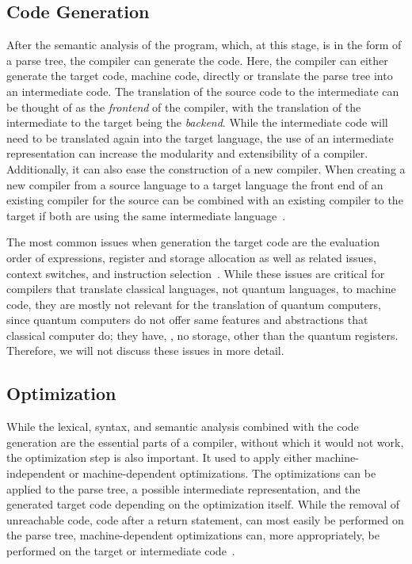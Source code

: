 \subsection{Code Generation}
\label{sec:background_codeGeneration}
After the semantic analysis of the program, which, at this stage, is in the form of a parse tree, the compiler can generate the code. Here, the compiler can either generate the target code, \eg machine code, directly or translate the parse tree into an intermediate code. 
The translation of the source code to the intermediate can be thought of as the \emph{frontend} of the compiler, with the translation of the intermediate to the target being the \emph{backend}. While the intermediate code will need to be translated again into the target language, the use of an intermediate representation can increase the modularity and extensibility of a compiler. Additionally, it can also ease the construction of a new compiler. When creating a new compiler from a source language to a target language the front end of an existing compiler for the source can be combined with an existing compiler to the target if both are using the same intermediate language~\cite{VSSD07, GFH82}.     

The most common issues when generation the target code are the evaluation order of expressions, register and storage allocation as well as related issues, context switches, and instruction selection~\cite{GFH82}. While these issues are critical for compilers that translate classical languages, \ie not quantum languages, to machine code, they are mostly not relevant for the translation of quantum computers, since quantum computers do not offer same features and abstractions that classical computer do; they have, \eg, no storage, other than the quantum registers.
Therefore, we will not discuss these issues in more detail.

\subsection{Optimization}
\label{sec:background_codeOptimization}
While the lexical, syntax, and semantic analysis combined with the code generation are the essential parts of a compiler, without which it would not work, the optimization step is also important. It used to apply either machine-independent or machine-dependent optimizations. The optimizations can be applied to the parse tree, a possible intermediate representation, and the generated target code depending on the optimization itself. While the removal of unreachable code, \eg code after a return statement, can most easily be performed on the parse tree, machine-dependent optimizations can, more appropriately, be performed on the target or intermediate code~\cite{Oliv07,VSSD07}.

